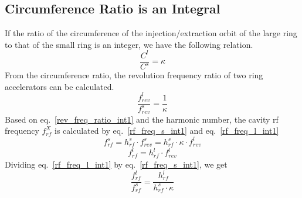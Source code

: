 %
 


\subsection{Circumference Ratio is an Integral}
\label{sec:cir_integer}
If the ratio of the circumference of the injection/extraction orbit of the large ring to that of the small ring is an integer, we have the following relation. 
\begin{equation}
\frac{C^l}{C^s}=\kappa \label{circumference_ratio_int1}
\end{equation}
From the circumference ratio, the revolution frequency ratio of two ring accelerators can be calculated.
\begin{equation}
\frac{f_{\mathit{rev}}^{l}}{f_{\mathit{rev}}^{s}}=\frac{1}{\kappa} \label{rev_freq_ratio_int1}
\end{equation}
Based on eq.~\ref{rev_freq_ratio_int1} and the harmonic number, the cavity rf frequency $f_{rf}^{X}$ is calculated by eq.~\ref{rf_freq_s_int1} and eq.~\ref{rf_freq_l_int1}
\begin{equation} 
f_{\mathit{rf}}^{s}= h^s_\mathit{rf} \cdot f_{\mathit{rev}}^{s}=h^s_\mathit{rf} \cdot \kappa \cdot f_{rev}^{l} \label{rf_freq_s_int1}
\end{equation}
\begin{equation} 
f_{\mathit{rf}}^{l}= h^l_\mathit{rf} \cdot f_{\mathit{rev}}^{l} \label{rf_freq_l_int1}
\end{equation}
Dividing eq.~\ref{rf_freq_l_int1} by eq.~\ref{rf_freq_s_int1}, we get
\begin{equation} 
\frac{f_{\mathit{rf}}^{l}}{f_{\mathit{rf}}^{s}}= \frac{h^l_\mathit{rf}}{h^s_\mathit{rf} \cdot \kappa} \label{rf_freq_ratio1}
\end{equation}

